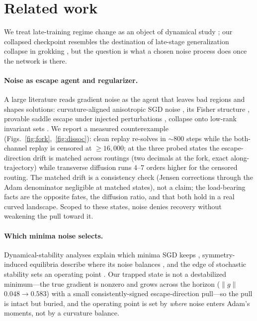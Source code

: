 \section{Related work}
\label{sec:related}

We treat late-training regime change as an object of dynamical study
\citep{position}; our collapsed checkpoint resembles the destination of late-stage
generalization collapse in grokking \citep{antigrok}, but the question is what a
chosen noise process does once the network is there.

\paragraph{Noise as escape agent and regularizer.}
A large literature reads gradient noise as the agent that leaves bad regions and
shapes solutions: curvature-aligned anisotropic SGD noise \citep{zhu}, its Fisher
structure \citep{wenfisher}, provable saddle escape under injected perturbations
\citep{saddle}, collapse onto low-rank invariant sets \citep{stochcollapse}. We
report a measured counterexample (Figs.~\ref{fig:fork},~\ref{fig:dissoc}): clean
replay re-solves in ${\sim}800$ steps while the both-channel replay is censored at
${\ge}16{,}000$; at the three probed states the escape-direction drift is matched
across routings (two decimals at the fork, exact along-trajectory) while
transverse diffusion runs $4$--$7$ orders higher for the censored routing. The
matched drift is a consistency check (Jensen corrections through the Adam
denominator negligible at matched states), not a claim; the load-bearing facts are
the opposite fates, the diffusion ratio, and that both hold in a real curved
landscape. Scoped to these states, noise denies recovery without weakening the
pull toward it.

\paragraph{Which minima noise selects.}
Dynamical-stability analyses explain which minima SGD keeps \citep{wumae},
symmetry-induced equilibria describe where its noise balances \citep{ziyin}, and
the edge of stochastic stability sets an operating point \citep{eoss}. Our trapped
state is not a destabilized minimum---the true gradient is nonzero and grows
across the horizon ($\|g\|$ $0.048\!\to\!0.583$) with a small consistently-signed
escape-direction pull---so the pull is intact but buried, and the operating point
is set by \emph{where} noise enters Adam's moments, not by a curvature balance.


